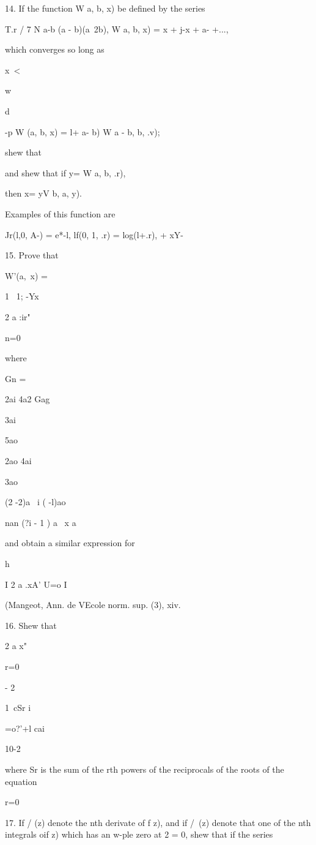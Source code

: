 {14. If the function W a, b, x) be defined by the series

T.r / 7 N a-b (a - b)(a~2b), W a, b, x) = x + j-x + a- +...,

which converges so long as

x\ <

w

d

-p W (a, b, x) = l+ a- b) W a - b, b, .v);

shew that

and shew that if y= W a, b, .r),

then x= yV b, a, y).

Examples of this function are

Jr(l,0, A-) = e*-l, lf(0, 1, .r) = log(l+.r), + xY-\

15. Prove that

W'(a, \,x) =

1 \ 1; -Yx


2 a :ir"

n=0

where

Gn =

2ai 4a2 Gag

3ai

5ao

2ao 4ai

3ao

(2 -2)a \ i ( -l)ao

nan (?i - 1 ) a \ x a

and obtain a similar expression for

h

I 2 a .xA' U=o I

(Mangeot, Ann. de VEcole norm. sup. (3), xiv.

16. Shew that

2 a x"

r=0

- 2

1\ cSr i

=o?'+l cai

10-2

%
%

where Sr is the sum of the rth powers of the reciprocals of the roots
of the equation

r=0


17. If / (z) denote the nth derivate of f z), and if /\ (z) denote
that one of the nth integrals oif z) which has an w-ple zero at 2 = 0,
shew that if the series

}
